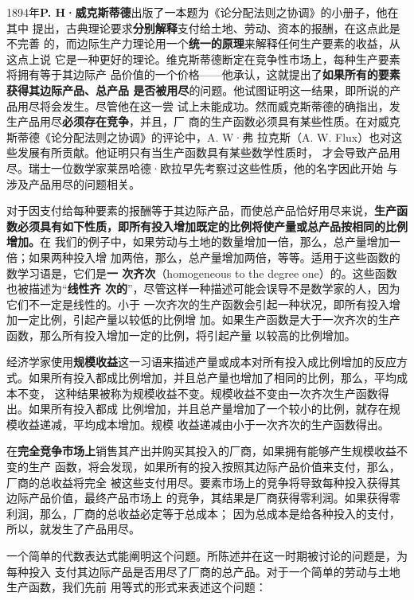 1894年\textbf{P. H·威克斯蒂德}出版了一本题为《论分配法则之协调》的小册子，他在其中
提出，古典理论要求\textbf{分别解释}支付给土地、劳动、资本的报酬，在这点此是不完善
的，而边际生产力理论用一个\textbf{统一的原理}来解释任何生产要素的收益，从这点上说
它是一种更好的理论。维克斯蒂德断定在竞争性市场上，每种生产要素将拥有等于其边际产
品价值的一个价格——他承认，这就提出了\textbf{如果所有的要素获得其边际产品、总产品
  是否被用尽}的问题。他试图证明这一结果，即所说的产品用尽将会发生。尽管他在这一尝
试上未能成功。然而威克斯蒂德的确指出，发生产品用尽\textbf{必须存在竞争}，并且，厂
商的生产函数必须具有某些性质。在对威克斯蒂德《论分配法则之协调》的评论中，A. W·弗
拉克斯（A. W. Flux）也对这些发展有所贡献。他证明只有当生产函数具有某些数学性质时，
才会导致产品用尽。瑞士一位数学家莱昂哈德·欧拉早先考察过这些性质，他的名字因此开始
与涉及产品用尽的问题相关。

对于因支付给每种要素的报酬等于其边际产品，而使总产品恰好用尽来说，\textbf{生产函
  数必须具有如下性质，即所有投入增加既定的比例将使产量或总产品按相同的比例增加。}在
我们的例子中，如果劳动与土地的数量增加一倍，那么，总产量增加一倍；如果两种投入增
加两倍，那么，总产量增加两倍，等等。适用于这些函数的数学习语是，它们是\textbf{一
  次齐次}（homogeneous to the degree one）的。这些函数也被描述为“\textbf{线性齐
  次的}”，尽管这样一种描述可能会误导不是数学家的人，因为它们不一定是线性的。小于
一次齐次的生产函数会引起一种状况，即所有投入增加一定比例，引起产量以较低的比例增
加。如果生产函数是大于一次齐次的生产函数，那么所有投入增加一定的比例，将引起产量
以较高的比例增加。

经济学家使用\textbf{规模收益}这一习语来描述产量或成本对所有投入成比例增加的反应方
式。如果所有投入都成比例增加，并且总产量也增加了相同的比例，那么，平均成本不变，
这种结果被称为规模收益不变。规模收益不变由一次齐次生产函数得出。如果所有投入都成
比例增加，并且总产量增加了一个较小的比例，就存在规模收益递减，平均成本增加。规模
收益递减由小于一次齐次的生产函数得出。

在\textbf{完全竞争市场上}销售其产出并购买其投入的厂商，如果拥有能够产生规模收益不变的生产
函数，将会发现，如果所有的投入按照其边际产品价值来支付，那么，厂商的总收益将完全
被这些支付用尽。要素市场上的竞争将导致每种投入获得其边际产品价值，最终产品市场上
的竞争，其结果是厂商获得零利润。如果获得零利润，那么，厂商的总收益必定等于总成本；
因为总成本是给各种投入的支付，所以，就发生了产品用尽。

一个简单的代数表达式能阐明这个问题。所陈述并在这一时期被讨论的问题是，为每种投入
支付其边际产品是否用尽了厂商的总产品。对于一个简单的劳动与土地生产函数，我们先前
用等式的形式来表述这个问题：

